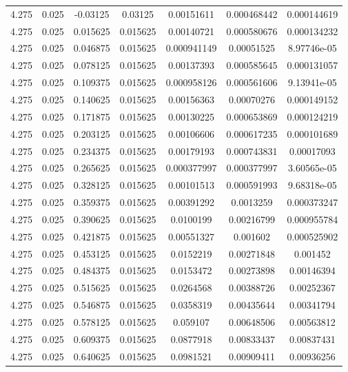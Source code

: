 \begin{table}[bh]
\begin{center}
{\begin{tabular}{ccccccc}
4.275	 & 0.025 & 	-0.03125	 & 0.03125	 & 0.00151611	 & 0.000468442	 & 0.000144619 \\ 
4.275	 & 0.025 & 	0.015625	 & 0.015625	 & 0.00140721	 & 0.000580676	 & 0.000134232 \\ 
4.275	 & 0.025 & 	0.046875	 & 0.015625	 & 0.000941149	 & 0.00051525	 & 8.97746e-05 \\ 
4.275	 & 0.025 & 	0.078125	 & 0.015625	 & 0.00137393	 & 0.000585645	 & 0.000131057 \\ 
4.275	 & 0.025 & 	0.109375	 & 0.015625	 & 0.000958126	 & 0.000561606	 & 9.13941e-05 \\ 
4.275	 & 0.025 & 	0.140625	 & 0.015625	 & 0.00156363	 & 0.00070276	 & 0.000149152 \\ 
4.275	 & 0.025 & 	0.171875	 & 0.015625	 & 0.00130225	 & 0.000653869	 & 0.000124219 \\ 
4.275	 & 0.025 & 	0.203125	 & 0.015625	 & 0.00106606	 & 0.000617235	 & 0.000101689 \\ 
4.275	 & 0.025 & 	0.234375	 & 0.015625	 & 0.00179193	 & 0.000743831	 & 0.00017093 \\ 
4.275	 & 0.025 & 	0.265625	 & 0.015625	 & 0.000377997	 & 0.000377997	 & 3.60565e-05 \\ 
4.275	 & 0.025 & 	0.328125	 & 0.015625	 & 0.00101513	 & 0.000591993	 & 9.68318e-05 \\ 
4.275	 & 0.025 & 	0.359375	 & 0.015625	 & 0.00391292	 & 0.0013259	 & 0.000373247 \\ 
4.275	 & 0.025 & 	0.390625	 & 0.015625	 & 0.0100199	 & 0.00216799	 & 0.000955784 \\ 
4.275	 & 0.025 & 	0.421875	 & 0.015625	 & 0.00551327	 & 0.001602	 & 0.000525902 \\ 
4.275	 & 0.025 & 	0.453125	 & 0.015625	 & 0.0152219	 & 0.00271848	 & 0.001452 \\ 
4.275	 & 0.025 & 	0.484375	 & 0.015625	 & 0.0153472	 & 0.00273898	 & 0.00146394 \\ 
4.275	 & 0.025 & 	0.515625	 & 0.015625	 & 0.0264568	 & 0.00388726	 & 0.00252367 \\ 
4.275	 & 0.025 & 	0.546875	 & 0.015625	 & 0.0358319	 & 0.00435644	 & 0.00341794 \\ 
4.275	 & 0.025 & 	0.578125	 & 0.015625	 & 0.059107	 & 0.00648506	 & 0.00563812 \\ 
4.275	 & 0.025 & 	0.609375	 & 0.015625	 & 0.0877918	 & 0.00833437	 & 0.00837431 \\ 
4.275	 & 0.025 & 	0.640625	 & 0.015625	 & 0.0981521	 & 0.00909411	 & 0.00936256 \\ 

\end{tabular}}
\end{center}
\end{table}
